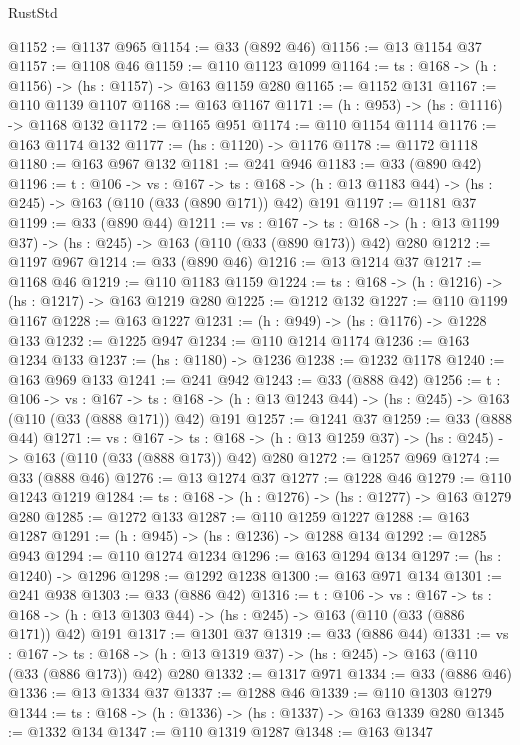 \begin{lexlean}{RustStd}
\begin{coremodule}
@1152 := @1137 @965
@1154 := @33 (@892 @46)
@1156 := @13 @1154 @37
@1157 := @1108 @46
@1159 := @110 @1123 @1099
@1164 := {ts : @168} -> (h : @1156) -> (hs : @1157) -> @163 @1159 @280
@1165 := @1152 @131
@1167 := @110 @1139 @1107
@1168 := @163 @1167
@1171 := (h : @953) -> (hs : @1116) -> @1168 @132
@1172 := @1165 @951
@1174 := @110 @1154 @1114
@1176 := @163 @1174 @132
@1177 := (hs : @1120) -> @1176
@1178 := @1172 @1118
@1180 := @163 @967 @132
@1181 := @241 @946
@1183 := @33 (@890 @42)
@1196 := {t : @106} ->
  {vs : @167} ->
  {ts : @168} -> (h : @13 @1183 @44) -> (hs : @245) -> @163 (@110 (@33 (@890 @171)) @42) @191
@1197 := @1181 @37
@1199 := @33 (@890 @44)
@1211 := {vs : @167} ->
  {ts : @168} -> (h : @13 @1199 @37) -> (hs : @245) -> @163 (@110 (@33 (@890 @173)) @42) @280
@1212 := @1197 @967
@1214 := @33 (@890 @46)
@1216 := @13 @1214 @37
@1217 := @1168 @46
@1219 := @110 @1183 @1159
@1224 := {ts : @168} -> (h : @1216) -> (hs : @1217) -> @163 @1219 @280
@1225 := @1212 @132
@1227 := @110 @1199 @1167
@1228 := @163 @1227
@1231 := (h : @949) -> (hs : @1176) -> @1228 @133
@1232 := @1225 @947
@1234 := @110 @1214 @1174
@1236 := @163 @1234 @133
@1237 := (hs : @1180) -> @1236
@1238 := @1232 @1178
@1240 := @163 @969 @133
@1241 := @241 @942
@1243 := @33 (@888 @42)
@1256 := {t : @106} ->
  {vs : @167} ->
  {ts : @168} -> (h : @13 @1243 @44) -> (hs : @245) -> @163 (@110 (@33 (@888 @171)) @42) @191
@1257 := @1241 @37
@1259 := @33 (@888 @44)
@1271 := {vs : @167} ->
  {ts : @168} -> (h : @13 @1259 @37) -> (hs : @245) -> @163 (@110 (@33 (@888 @173)) @42) @280
@1272 := @1257 @969
@1274 := @33 (@888 @46)
@1276 := @13 @1274 @37
@1277 := @1228 @46
@1279 := @110 @1243 @1219
@1284 := {ts : @168} -> (h : @1276) -> (hs : @1277) -> @163 @1279 @280
@1285 := @1272 @133
@1287 := @110 @1259 @1227
@1288 := @163 @1287
@1291 := (h : @945) -> (hs : @1236) -> @1288 @134
@1292 := @1285 @943
@1294 := @110 @1274 @1234
@1296 := @163 @1294 @134
@1297 := (hs : @1240) -> @1296
@1298 := @1292 @1238
@1300 := @163 @971 @134
@1301 := @241 @938
@1303 := @33 (@886 @42)
@1316 := {t : @106} ->
  {vs : @167} ->
  {ts : @168} -> (h : @13 @1303 @44) -> (hs : @245) -> @163 (@110 (@33 (@886 @171)) @42) @191
@1317 := @1301 @37
@1319 := @33 (@886 @44)
@1331 := {vs : @167} ->
  {ts : @168} -> (h : @13 @1319 @37) -> (hs : @245) -> @163 (@110 (@33 (@886 @173)) @42) @280
@1332 := @1317 @971
@1334 := @33 (@886 @46)
@1336 := @13 @1334 @37
@1337 := @1288 @46
@1339 := @110 @1303 @1279
@1344 := {ts : @168} -> (h : @1336) -> (hs : @1337) -> @163 @1339 @280
@1345 := @1332 @134
@1347 := @110 @1319 @1287
@1348 := @163 @1347

\end{coremodule}
\end{lexlean}
